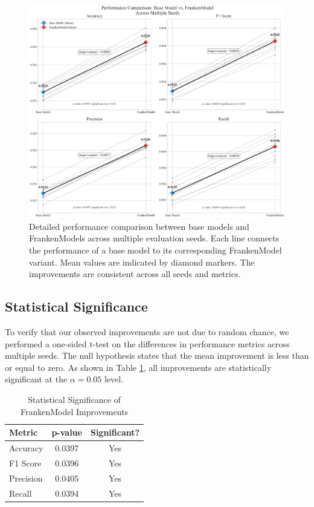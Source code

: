 \documentclass[conference]{IEEEtran}
\begin{document}
\begin{figure}[!t]
\centering
\includegraphics[width=\linewidth]{metric_comparison.png}
\caption{Detailed performance comparison between base models and FrankenModels across multiple evaluation seeds. Each line connects the performance of a base model to its corresponding FrankenModel variant. Mean values are indicated by diamond markers. The improvements are consistent across all seeds and metrics.}
\label{fig:metric_comparison}
\end{figure}

\subsection{Statistical Significance}
To verify that our observed improvements are not due to random chance, we performed a one-sided t-test on the differences in performance metrics across multiple seeds. The null hypothesis states that the mean improvement is less than or equal to zero. As shown in Table \ref{tab:significance}, all improvements are statistically significant at the $\alpha = 0.05$ level.

\begin{table}[!t]
\caption{Statistical Significance of FrankenModel Improvements}
\label{tab:significance}
\centering
\begin{tabular}{lcc}
\toprule
\textbf{Metric} & \textbf{p-value} & \textbf{Significant?} \\
\midrule
Accuracy & 0.0397 & Yes \\
F1 Score & 0.0396 & Yes \\
Precision & 0.0405 & Yes \\
Recall & 0.0394 & Yes \\
\bottomrule
\end{tabular}
\end{table}
\end{document}

